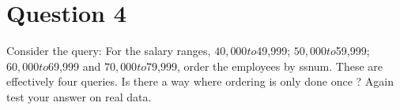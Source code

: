 \section*{Question 4}
Consider the query: For the salary ranges, $40,000 to $49,999; $50,000 to $59,999; $60,000 to $69,999 and $70,000 to $79,999, order the employees by ssnum. These are effectively four queries. Is there a way where ordering is only done once ? Again test your answer on real data.  


